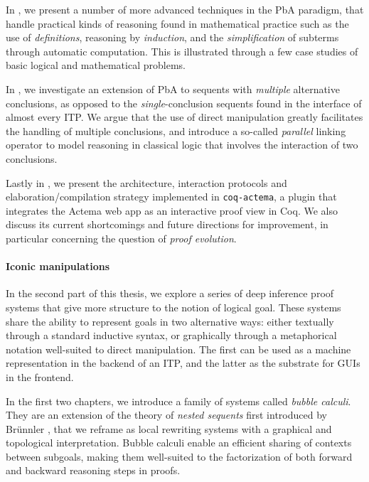 In , we present a number of more advanced techniques in the PbA
paradigm, that handle practical kinds of reasoning found in mathematical
practice such as the use of \emph{definitions}, reasoning by \emph{induction},
and the \emph{simplification} of subterms through automatic computation. This is
illustrated through a few case studies of basic logical and mathematical
problems.

In , we investigate an extension of PbA to sequents with
\emph{multiple} alternative conclusions, as opposed to the
\emph{single}-conclusion sequents found in the interface of almost every ITP. We
argue that the use of direct manipulation greatly facilitates the handling of
multiple conclusions, and introduce a so-called \emph{parallel} linking operator
to model reasoning in classical logic that involves the interaction of two
conclusions.

Lastly in , we present the architecture, interaction protocols and
elaboration/compilation strategy implemented in \texttt{coq-actema}, a plugin
that integrates the Actema web app as an interactive proof view in Coq. We also
discuss its current shortcomings and future directions for improvement, in
particular concerning the question of \emph{proof evolution}.

\paragraph{Iconic manipulations}
  
In the second part of this thesis, we explore a series of deep inference proof
systems that give more structure to the notion of logical goal. These systems
share the ability to represent goals in two alternative ways: either textually
through a standard inductive syntax, or graphically through a metaphorical
notation well-suited to direct manipulation. The first can be used as a machine
representation in the backend of an ITP, and the latter as the substrate for
GUIs in the frontend.

In the first two chapters, we introduce a family of systems called \emph{bubble
calculi}. They are an extension of the theory of \emph{nested sequents} first
introduced by Brünnler , that we reframe as local
rewriting systems with a graphical and topological interpretation. Bubble
calculi enable an efficient sharing of contexts between subgoals, making them
well-suited to the factorization of both forward and backward reasoning steps in
proofs.

